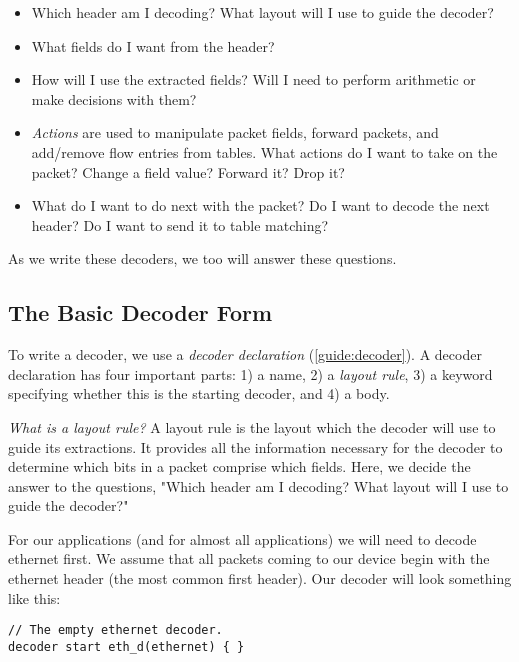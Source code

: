 \begin{itemize}
\item Which header am I decoding? What layout will I use to guide the decoder?

\item What fields do I want from the header?

\item How will I use the extracted fields? Will I need to perform arithmetic or make decisions with them?

\item \textit{Actions} are used to manipulate packet fields, forward packets, and add/remove flow entries from tables. What actions do I want to take on the packet? Change a field value? Forward it? Drop it? 

\item What do I want to do next with the packet? Do I want to decode the next header? Do I want to send it to table matching? 
\end{itemize}

As we write these decoders, we too will answer these questions.

\subsection{The Basic Decoder Form} \label{tut:basic_decoder}

To write a decoder, we use a \textit{decoder declaration} (\ref{guide:decoder}). A decoder declaration has four important parts: 1) a name, 2) a \textit{layout rule}, 3) a keyword specifying whether this is the starting decoder, and 4) a body.

\textit{What is a layout rule?} A layout rule is the layout which the decoder will use to guide its extractions. It provides all the information necessary for the decoder to determine which bits in a packet comprise which fields. Here, we decide the answer to the questions, "Which header am I decoding? What layout will I use to guide the decoder?"

For our applications (and for almost all applications) we will need to decode ethernet first. We assume that all packets coming to our device begin with the ethernet header (the most common first header). Our decoder will look something like this:

\begin{codepage}
\begin{lstlisting}
// The empty ethernet decoder.
decoder start eth_d(ethernet) { }
\end{lstlisting}
\end{codepage}

